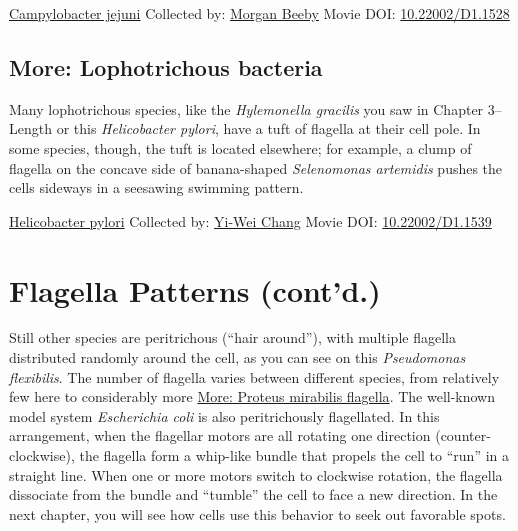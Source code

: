 \documentclass[]{tufte-book}
\begin{document}
\hypertarget{htmlwidget-1980ddacd81c7b574c2d}{}

\label{fig:6-4}\protect\hyperlink{tree}{Campylobacter jejuni} Collected by: \protect\hyperlink{morgan_beeby}{Morgan Beeby} Movie DOI: \href{https://doi.org/10.22002/D1.1528}{10.22002/D1.1528}

\hypertarget{Lophotrichous_bacteria}{%
\subsection*{More: Lophotrichous bacteria}\label{Lophotrichous_bacteria}}

Many lophotrichous species, like the \emph{Hylemonella gracilis} you saw in Chapter 3--Length or this \emph{Helicobacter pylori}, have a tuft of flagella at their cell pole. In some species, though, the tuft is located elsewhere; for example, a clump of flagella on the concave side of banana-shaped \emph{Selenomonas artemidis} pushes the cells sideways in a seesawing swimming pattern.



\hypertarget{htmlwidget-a9acc3ed8a6eb20c7ad5}{}

\label{fig:6-4a}\protect\hyperlink{tree}{Helicobacter pylori} Collected by: \protect\hyperlink{yi-wei_chang}{Yi-Wei Chang} Movie DOI: \href{https://doi.org/10.22002/D1.1539}{10.22002/D1.1539}

\hypertarget{flagella-patterns-contd.}{%
\section{Flagella Patterns (cont'd.)}\label{flagella-patterns-contd.}}

Still other species are peritrichous (``hair around''), with multiple flagella distributed randomly around the cell, as you can see on this \emph{Pseudomonas flexibilis}. The number of flagella varies between different species, from relatively few here to considerably more \protect\hyperlink{Proteus_mirabilis_flagella}{More: Proteus mirabilis flagella}. The well-known model system \emph{Escherichia coli} is also peritrichously flagellated. In this arrangement, when the flagellar motors are all rotating one direction (counter-clockwise), the flagella form a whip-like bundle that propels the cell to ``run'' in a straight line. When one or more motors switch to clockwise rotation, the flagella dissociate from the bundle and ``tumble'' the cell to face a new direction. In the next chapter, you will see how cells use this behavior to seek out favorable spots.
\end{document}
